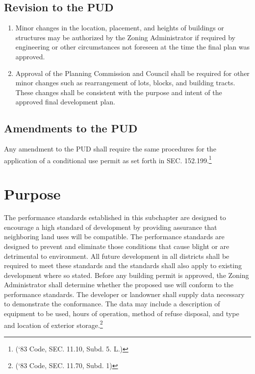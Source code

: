 \subsection{Revision to the PUD}
\begin{enumerate}[{\indent}1)]
    \item Minor changes in the location, placement, and heights of buildings or structures may be authorized by the Zoning Administrator if required by engineering or other circumstances not foreseen at the time the final plan was approved.
    \item Approval of the Planning Commission and Council shall be required for other minor changes such as rearrangement of lots, blocks, and building tracts.  These changes shall be consistent with the purpose and intent of the approved final development plan.
\end{enumerate}
\subsection{Amendments to the PUD}
Any amendment to the PUD shall require the same procedures for the application of a conditional use permit as set forth in SEC. 152.199.\footnote{(‘83 Code, SEC. 11.10, Subd. 5. L.)}


\setcounter{section}{154}
\section{Purpose}
The performance standards established in this subchapter are designed to encourage a high standard of development by providing assurance that neighboring land uses will be compatible. The performance standards are designed to prevent and eliminate those conditions that cause blight or are detrimental to environment. All future development in all districts shall be required to meet these standards and the standards shall also apply to existing development where so stated. Before any building permit is approved, the Zoning Administrator shall determine whether the proposed use will conform to the performance standards. The developer or landowner shall supply data necessary to demonstrate the conformance.  The data may include a description of equipment to be used, hours of operation, method of refuse disposal, and type and location of exterior storage.\footnote{(‘83 Code, SEC. 11.70, Subd. 1)}

